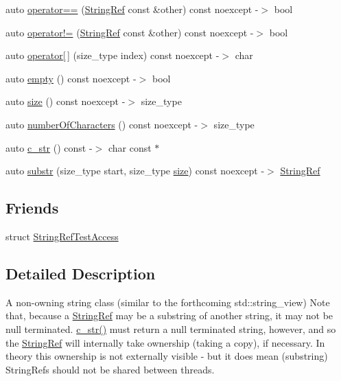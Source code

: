 \begin{DoxyCompactItemize}
\item 
auto \mbox{\hyperlink{classCatch_1_1StringRef_aabb30149ab961187e4b3ff3394bf6e73}{operator==}} (\mbox{\hyperlink{classCatch_1_1StringRef}{String\+Ref}} const \&other) const noexcept -\/$>$ bool
\item 
auto \mbox{\hyperlink{classCatch_1_1StringRef_aaa6c8bf61c4628034c19763d1c8ad215}{operator!=}} (\mbox{\hyperlink{classCatch_1_1StringRef}{String\+Ref}} const \&other) const noexcept -\/$>$ bool
\item 
auto \mbox{\hyperlink{classCatch_1_1StringRef_a4ba2e01eec1f0f56c257d213c796ab3b}{operator\mbox{[}$\,$\mbox{]}}} (size\+\_\+type index) const noexcept -\/$>$ char
\item 
auto \mbox{\hyperlink{classCatch_1_1StringRef_ac6b68b9dc1e1dec69e884e3f7be581bd}{empty}} () const noexcept -\/$>$ bool
\item 
auto \mbox{\hyperlink{classCatch_1_1StringRef_ae084d72cb2952cee61a63ef36611d0ad}{size}} () const noexcept -\/$>$ size\+\_\+type
\item 
auto \mbox{\hyperlink{classCatch_1_1StringRef_a6a6cac7430e626ffdd7550a081e8168f}{number\+Of\+Characters}} () const noexcept -\/$>$ size\+\_\+type
\item 
auto \mbox{\hyperlink{classCatch_1_1StringRef_a1669cb2765e820ca258159676cbd82a5}{c\+\_\+str}} () const -\/$>$ char const $\ast$
\item 
auto \mbox{\hyperlink{classCatch_1_1StringRef_a248568b467cf6599320903ae613c8eee}{substr}} (size\+\_\+type start, size\+\_\+type \mbox{\hyperlink{classCatch_1_1StringRef_ae084d72cb2952cee61a63ef36611d0ad}{size}}) const noexcept -\/$>$ \mbox{\hyperlink{classCatch_1_1StringRef}{String\+Ref}}
\end{DoxyCompactItemize}
\subsection*{Friends}
\begin{DoxyCompactItemize}
\item 
struct \mbox{\hyperlink{classCatch_1_1StringRef_a420e64e1652de1b0d427775781b018f5}{String\+Ref\+Test\+Access}}
\end{DoxyCompactItemize}


\subsection{Detailed Description}
A non-\/owning string class (similar to the forthcoming std\+::string\+\_\+view) Note that, because a \mbox{\hyperlink{classCatch_1_1StringRef}{String\+Ref}} may be a substring of another string, it may not be null terminated. \mbox{\hyperlink{classCatch_1_1StringRef_a1669cb2765e820ca258159676cbd82a5}{c\+\_\+str()}} must return a null terminated string, however, and so the \mbox{\hyperlink{classCatch_1_1StringRef}{String\+Ref}} will internally take ownership (taking a copy), if necessary. In theory this ownership is not externally visible -\/ but it does mean (substring) String\+Refs should not be shared between threads. 

